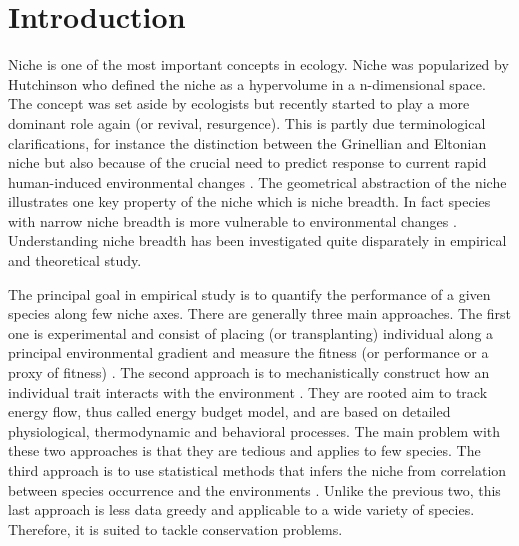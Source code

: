 \section*{Introduction}
Niche is one of the most important concepts in ecology.
Niche was popularized by Hutchinson \citet{Hutchinson1957} who defined the niche as a hypervolume in a n-dimensional space.
The concept was set aside by ecologists but recently started to play a more dominant role again (or revival, resurgence).
This is partly due terminological clarifications, for instance the distinction between the Grinellian and Eltonian niche \citep{Chase2003} but also because of the crucial need to predict response to current rapid human-induced environmental changes \citep[e.g.,][]{Kearney2009}.
The geometrical abstraction of the niche illustrates one key property of the niche which is niche breadth.
In fact species with narrow niche breadth is more vulnerable to environmental changes \citep{Henle2006}.
Understanding niche breadth has been investigated quite disparately in empirical and theoretical study.

The principal goal in empirical study is to quantify the performance of a given species along few niche axes.
There are generally three main approaches.
The first one is experimental and consist of placing (or transplanting) individual along a principal environmental gradient and measure the fitness (or performance or a proxy of fitness) \citep{Birch1953, Elliot1982,Angert2006,Frazier2006}.
The second approach is to mechanistically construct how an individual trait interacts with the environment \citep{Kooijiman2009, Kearney2009, Buckley2009}.%
They are rooted aim to track energy flow, thus called energy budget model, and are based on detailed physiological, thermodynamic and behavioral processes. 
The main problem with these two approaches is that they are tedious and applies to few species.
The third approach is to use statistical methods that infers the niche from correlation between species occurrence and the environments \citep{Guissan2005, Austin2006, Elith2009}. %
Unlike the previous two, this last approach is less data greedy and applicable to a wide variety of species.
Therefore, it is suited to tackle conservation problems.
 
